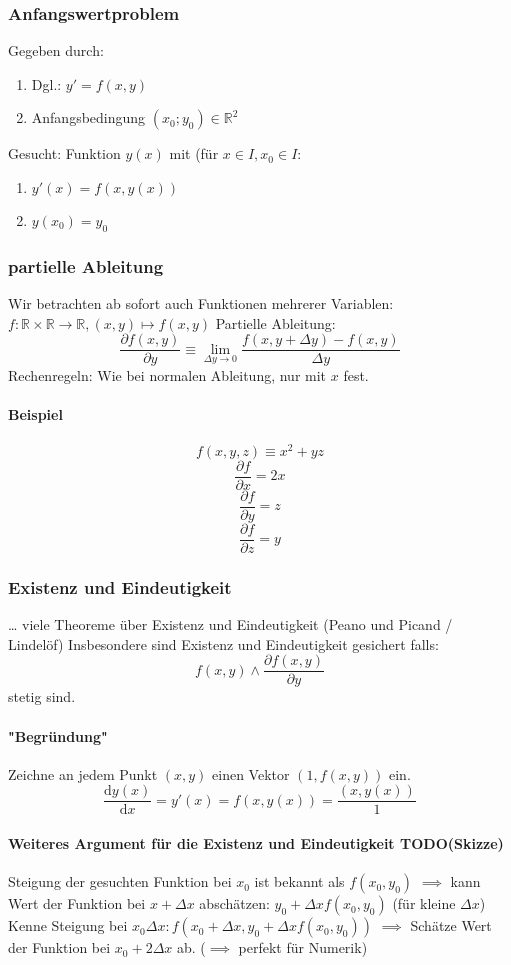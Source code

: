 \documentclass[a4paper]{scrartcl}
\renewcommand{\d}{\mathrm{d}}
\newcommand{\f}[2]{\frac{#1}{#2}}
\theoremstyle{definition}
\theoremstyle{plain}
\theoremstyle{remark}
\theoremstyle{remark}
\begin{document}
\subsubsection{Anfangswertproblem}
\label{sec-3-3-2}
Gegeben durch:
\begin{enumerate}
\item Dgl.: $y' = f(x,y)$
\item Anfangsbedingung $(x_0;y_0) \in \mathbb{R}^2$
\end{enumerate}
Gesucht: Funktion $y(x)$ mit (für $x\in I, x_0 \in I$:
\begin{enumerate}
\item $y'(x) = f(x,y(x))$
\item $y(x_0) = y_0$
\end{enumerate}
\subsubsection{partielle Ableitung}
\label{sec-3-3-3}
Wir betrachten ab sofort auch Funktionen mehrerer Variablen: $f:\mathbb{R}\times\mathbb{R}\to\mathbb{R},(x,y)\mapsto f(x,y)$
Partielle Ableitung: \[\f{\partial f(x,y)}{\partial y} \equiv \lim_{\Delta y \to 0} \f{f(x,y + \Delta y) - f(x,y)}{\Delta y}\]
Rechenregeln: Wie bei normalen Ableitung, nur mit $x$ fest.
\paragraph{Beispiel}
\label{sec-3-3-3-1}
\[f(x,y,z) \equiv x^2 + y z\]
\[\f{\partial f}{\partial x} = 2x\]
\[\f{\partial f}{\partial y} = z\]
\[\f{\partial f}{\partial z} = y\]
\subsubsection{Existenz und Eindeutigkeit}
\label{sec-3-3-4}
\ldots{} viele Theoreme über Existenz und Eindeutigkeit (Peano und Picand / Lindelöf)
Insbesondere sind Existenz und Eindeutigkeit gesichert falls:
\[f(x,y) \wedge \f{\partial f(x,y)}{\partial y}\]
stetig sind.
\paragraph{"Begründung"}
\label{sec-3-3-4-1}
Zeichne an jedem Punkt $(x,y)$ einen Vektor $(1,f(x,y))$ ein.
\[\f{\d y(x)}{\d x} = y'(x) = f(x,y(x)) = \f{(x,y(x))}{1}\]
\paragraph{Weiteres Argument für die Existenz und Eindeutigkeit TODO(Skizze)}
\label{sec-3-3-4-2}
Steigung der gesuchten Funktion bei $x_0$ ist bekannt als $f(x_0, y_0)$
$\implies$ kann Wert der Funktion bei $x + \Delta x$ abschätzen: $y_0 + \Delta x f(x_0,y_0)$ (für kleine $\Delta x$)
Kenne Steigung bei $x_0 \Delta x: f(x_0 + \Delta x, y_0 + \Delta x f(x_0,y_0))$
$\implies$ Schätze Wert der Funktion bei $x_0 + 2\Delta x$ ab. ($\implies$ perfekt für Numerik)
\end{document}
